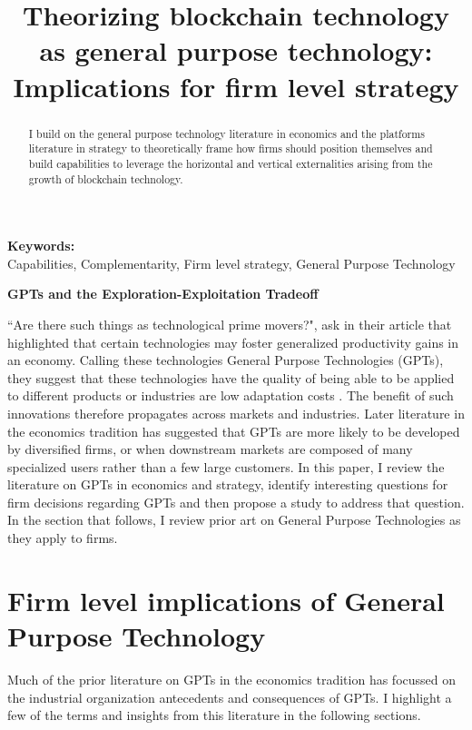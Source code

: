 \documentclass[12pt,letterpaper]{article}
\begin{document}
\title{Theorizing blockchain technology as general purpose technology: Implications for firm level strategy}
\date{}
\maketitle
\thispagestyle{empty}
\renewcommand{\abstractname}{\normalsize ABSTRACT}
\begin{abstract} 
\normalsize 
I build on the general purpose technology literature in economics and the platforms literature in strategy to theoretically frame how firms should position themselves and build capabilities to leverage the horizontal and vertical externalities arising from the growth of blockchain technology.
\end{abstract}


{\textbf{Keywords:} \\\indent Capabilities, Complementarity, Firm level strategy, General Purpose Technology}

\newpage
\pagestyle{fancy}
\fancyhf{}
\rhead{\thepage}

\begin{center}
\textbf{GPTs and the Exploration-Exploitation Tradeoff}
\end{center}
``Are there such things as \textquotesingle technological prime movers\textquotesingle ?", ask \cite{Bresnahan1995} in their article that highlighted that certain technologies may foster generalized productivity gains in an economy. Calling these technologies General Purpose Technologies (GPTs), they suggest that these technologies have the quality of being able to be applied to different products or industries are low adaptation costs \citep{Rosenberg2004}. The benefit of such innovations therefore propagates across markets and industries. Later literature in the economics tradition has suggested that GPTs are more likely to be developed by diversified firms, or when downstream markets are composed of many specialized users rather than a few large customers.  In this paper, I review the literature on GPTs in economics and strategy, identify interesting questions for firm decisions regarding GPTs and then propose a study to address that question. In the section that follows, I review prior art on General Purpose Technologies as they apply to firms.

\section{Firm level implications of General Purpose Technology}
Much of the prior literature on GPTs in the economics tradition has focussed on the industrial organization antecedents and consequences of GPTs. I highlight a few of the terms and insights from this literature in the following sections.
\end{document}
